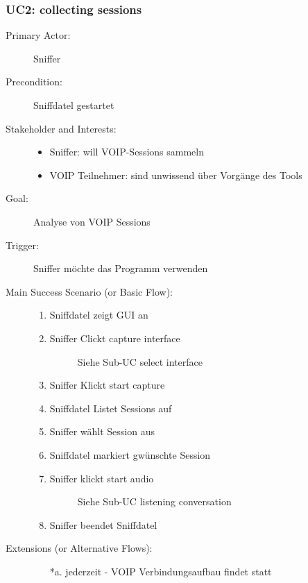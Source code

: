 \documentclass[a4,12pt]{scrartcl}
\begin{document}
\subsubsection{UC2: collecting sessions}
	\begin{description}
		\item[Primary Actor:] Sniffer
		\item[Precondition:] Sniffdatel gestartet
  		\item[Stakeholder and Interests:] \hfill
  			\begin{itemize}
  				\item Sniffer: will VOIP-Sessions sammeln
  				\item VOIP Teilnehmer: sind unwissend über Vorgänge des Tools
  			\end{itemize}
 		\item[Goal:] Analyse von VOIP Sessions
  		\item[Trigger:] Sniffer möchte das Programm verwenden
 		\item[Main Success Scenario (or Basic Flow):] \hfill
  			\begin{enumerate}
  				\item Sniffdatel zeigt GUI an
				\item Sniffer Clickt \grqq capture interface\grqq
					\begin{description}
  						\item[] Siehe Sub-UC \grqq select interface\grqq 
  					\end{description}
				\item Sniffer Klickt \grqq start capture\grqq 
				\item Sniffdatel Listet Sessions auf
				\item Sniffer wählt Session aus
				\item Sniffdatel markiert gwünschte Session
				\item Sniffer klickt \grqq start audio\grqq 
					\begin{description}
  						\item[] Siehe Sub-UC \grqq listening conversation\grqq 
  					\end{description}				
				\item Sniffer beendet Sniffdatel
			\end{enumerate}
  		\item[Extensions (or Alternative Flows):] \hfill  
  			\begin{itemize}
				\item[*a.] jederzeit - VOIP Verbindungsaufbau findet statt

\end{itemize}
\end{description}
\end{document}
